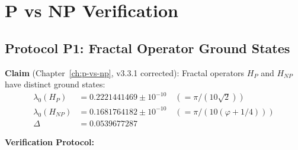 \section{P vs NP Verification}
\label{sec:pvsnp-verification}

\subsection{Protocol P1: Fractal Operator Ground States}

\textbf{Claim} (Chapter~\ref{ch:p-vs-np}, v3.3.1 corrected): Fractal operators $H_P$ and $H_{NP}$ have distinct ground states:
\begin{align}
\lambda_0(H_P) &= 0.2221441469 \pm 10^{-10} \quad (= \pi/(10\sqrt{2})) \\
\lambda_0(H_{NP}) &= 0.1681764182 \pm 10^{-10} \quad (= \pi/(10(\varphi+1/4))) \\
\Delta &= 0.0539677287
\end{align}

\textbf{Verification Protocol:}

